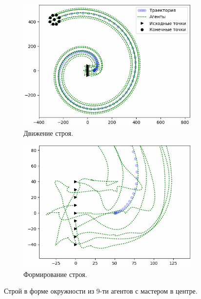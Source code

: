 \documentclass[a4paper, 14pt]{extarticle}
\begin{document}
\begin{figure}[!htbp]
	\centering
	\begin{subfigure}{.5\textwidth}
		\centering
		\includegraphics[width=1\linewidth]{others/circle-platoon}
		\caption{Движение строя.}
		\label{fig:circle-platoon-all}
	\end{subfigure}%
	\begin{subfigure}{.5\textwidth}
		\centering
		\includegraphics[width=1\linewidth]{others/circle-platoon-zoom1}
		\caption{Формирование строя.}
		\label{fig:circle-platoon-zoom1}
	\end{subfigure}
	\caption{Строй в форме окружности из 9-ти агентов с мастером в центре.}
	\label{fig:circle-platoon}
\end{figure}
\end{document}
